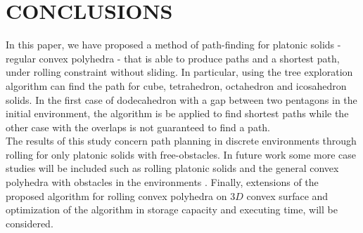 
\section{CONCLUSIONS}
In this paper, we have proposed a method of path-finding for platonic solids - regular convex polyhedra - that is able to produce paths and a shortest path, under rolling constraint without sliding. 
In particular, using the tree exploration algorithm can find the path for cube, tetrahedron, octahedron and icosahedron solids. 
In the first case of dodecahedron with a gap between two pentagons in the initial environment, the algorithm is be applied to find shortest paths while the other case with the overlaps is not guaranteed to find a path.\\


\noindent The results of this study concern path planning in discrete environments through rolling for only platonic solids with free-obstacles.
In future work some more case studies will be included such as rolling platonic solids and the general convex polyhedra with obstacles in the environments . 
Finally, extensions of the proposed algorithm for rolling convex polyhedra on $3D$ convex surface and optimization of the algorithm in storage capacity and executing time, will be considered.\\

%
%
%
